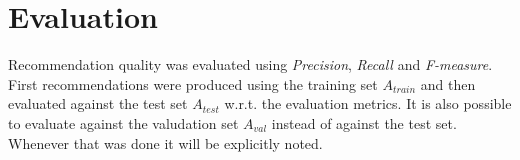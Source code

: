 
\section{Evaluation}\label{sec:method:eval}

Recommendation quality was evaluated using \textit{Precision}, \textit{Recall} and \textit{F-measure}. First recommendations were produced using the training set $A_{train}$ and then evaluated against the test set $A_{test}$ w.r.t. the evaluation metrics. It is also possible to evaluate against the valudation set $A_{val}$ instead of against the test set. Whenever that was done it will be explicitly noted.

